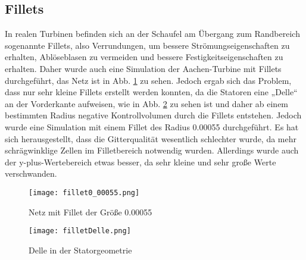 \subsection{Fillets}

In realen Turbinen befinden sich an der Schaufel am Übergang zum Randbereich sogenannte Fillets, also Verrundungen, um bessere Strömungseigenschaften zu erhalten, Ablöseblasen zu vermeiden und bessere Festigkeitseigenschaften zu erhalten. Daher wurde auch eine Simulation der Aachen-Turbine mit Fillets durchgeführt, das Netz ist in Abb. \ref{imgFillet1} zu sehen. Jedoch ergab sich das Problem, dass nur sehr kleine Fillets erstellt werden konnten, da die Statoren eine „Delle“ an der Vorderkante aufweisen, wie in Abb. \ref{imgFilletDelle} zu sehen ist und daher ab einem bestimmten Radius negative Kontrollvolumen durch die Fillets entstehen. Jedoch wurde eine Simulation mit einem Fillet des Radius 0.00055 durchgeführt. Es hat sich herausgestellt, dass die Gitterqualität wesentlich schlechter wurde, da mehr schrägwinklige Zellen im Filletbereich notwendig wurden. Allerdings wurde auch der y-plus-Wertebereich etwas besser, da sehr kleine und sehr große Werte verschwanden.     

  \begin{figure}[htbp]
	\centering
	\label{imgFillet1}
	\texttt{[image: fillet0\_00055.png]}
	\caption{Netz mit Fillet der Größe 0.00055}
\end{figure} 

  \begin{figure}[htbp]
	\centering
	\label{imgFilletDelle}
	\texttt{[image: filletDelle.png]}
	\caption{Delle in der Statorgeometrie}
\end{figure} 